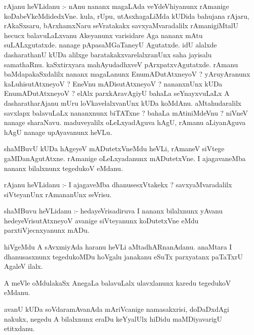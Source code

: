 \documentclass{article}
\begin{document}
\begin{mn}
rAjanu  heVLidanu :- nAnu  nananx  magaLAda  veYdeVhiyanunx  rAmanige  koDabeVkeMdidedxVne.  kula,  rUpu,  utAsxhagaLiMda  kUDida  bahujana  
rAjaru,  rAkaSxsaru,  bArxhamxNaru  seVratakakx  savxyaMvaradalilx  rAmanigiMtalU  hecucx  balavuLaLxvanu  Akeyanunx  varisidare  Aga  nananx  
mAtu  suLALxgutatxde.  nanage  pApasaMGaTaneyU  Agutatxde.  idU  alalxde  dasharathanU  kUDa  alilxge  baratakakxvarelalxranUnx  saha  jayisalu  
samathaRnu.  kaSxtirxyara  mahAyudadhxveV  pArxpatxvAgutatxde.  rAmanu  baMdapakaSxdalilx  nananx  magaLanunx  EnumADutAtxneyoV ?  yAruyAranunx  
kaLuhisutAtxneyoV ?  EneVnu  mADisutAtxneyoV ?  nananxnUnx  kUDa  EnumADutAtxneyoV ?  elAlx  parxkAravAgiyU  bahaLa  seYnayxvuLaLx  A  
dasharatharAjanu  mUru  loVkavelalxvanUnx  kUDa  koMdAnu.  aMtahudaralilx  savxlapx  balavuLaLx  nananxnunx  biTATxne ?  bahaLa  mAtiniMdeVnu ?  
niVneV  nanage  sharaNavu.  maduveyalilx  oLeLxyadAguva  hAgU,  rAmanu  aLiyanAguva  hAgU  nanage  upAyavanunx  heVLu.
\end{mn}

\begin{mn}
shaMBuvU  kUDa  hAgeyeV  mADutetxVneMdu  heVLi,  rAmaneV  siVtege  gaMDanAgutAtxne.  rAmanige  oLeLxyadanunx  mADutetxVne.  I  ajagavaneMba  
nananx  bilalxnunx  tegedukoV  eMdanu.
\end{mn}

\begin{mn}
rAjanu  heVLidanu :- I  ajagaveMba  dhanusesxVtakekx ?  savxyaMvaradalilx  siVteyanUnx  rAmananUnx  seVrisu.
\end{mn}

\begin{mn}
shaMBuvu  heVLidanu :- hedayeVrisadiruva  I  nananx  bilalxnunx  yAvanu  hedeyeVrisutAtxneyoV  avanige  siVteyanunx  koDutetxVne  eMdu  
parxtiVjecnxyanunx  mADu.
\end{mn}

\begin{mn}
hiVgeMdu  A  sAvxmiyAda  haranu  heVLi  aMtadhARnanAdanu.  anaMtara  I  dhanusasxnunx  tegedukoMDu  hoVgalu  janakanu  eSuTx  parxyatanx  
paTaTxrU  AgaleV  ilalx.
\end{mn}

\begin{mn}
A meVle  oMdulakaSx  AnegaLa  balavuLalx  ulavxlanunx  karedu  tegedukoV  eMdanu.
\end{mn}

\begin{mn}
avanU  kUDa  soVdaramAvanAda  mAriVcanige  namasakxrisi,  doDaDxdAgi  nakukx,  negedu  A  bilalxnunx  eraDu  keYyalUlx  hiDidu  
maMDiyavarigU  etitxdanu.
\end{mn}
\end{document}
